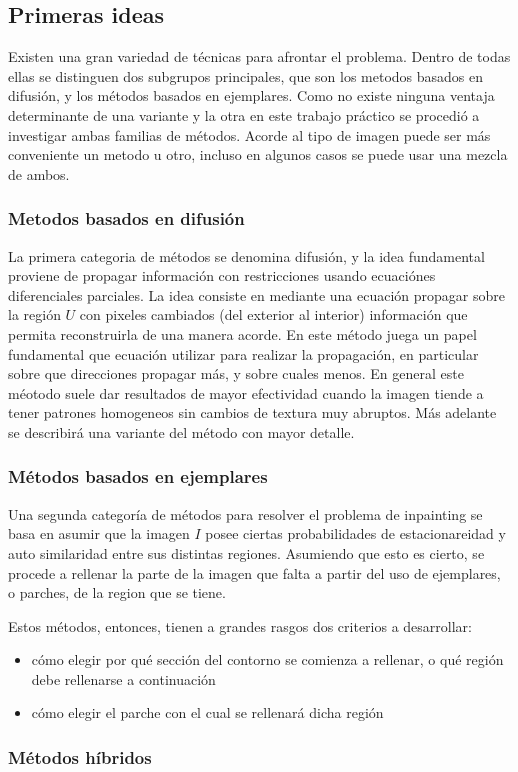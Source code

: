 \documentclass[assd_tpf_main.tex]{subfiles}
\begin{document}
\subsection{Primeras ideas}
Existen una gran variedad de técnicas para afrontar el problema. Dentro de todas ellas se distinguen dos subgrupos principales, que son los metodos basados en difusión, y los métodos basados en ejemplares. Como no existe ninguna ventaja determinante de una variante y la otra en este trabajo práctico se procedió a investigar ambas familias de métodos. Acorde al tipo de imagen puede ser más conveniente un metodo u otro, incluso en algunos casos se puede usar una mezcla de ambos.

\subsubsection{Metodos basados en difusión}
La primera categoria de métodos se denomina difusión, y la idea fundamental proviene de propagar información con restricciones usando ecuaciónes diferenciales parciales. La idea consiste en mediante una ecuación propagar sobre la región $U$ con pixeles cambiados (del exterior al interior) información que permita reconstruirla de una manera acorde.
En este método juega un papel fundamental que ecuación utilizar para realizar la propagación, en particular sobre que direcciones propagar más, y sobre cuales menos. En general este méotodo suele dar resultados de mayor efectividad cuando la imagen tiende a tener patrones homogeneos sin cambios de textura muy abruptos.  Más adelante se describirá una variante del método con mayor detalle.

\subsubsection{Métodos basados en ejemplares}

Una segunda categor\'ia de m\'etodos para resolver el problema de inpainting se basa en 
asumir que la imagen $I$ posee ciertas probabilidades de estacionareidad y auto similaridad 
entre sus distintas regiones. Asumiendo que esto es cierto, se procede a rellenar la parte
de la imagen que falta a partir del uso de ejemplares, o parches, de la region que se tiene.

Estos m\'etodos, entonces, tienen a grandes rasgos dos criterios a desarrollar:
\begin{itemize}
	\item c\'omo elegir por qu\'e secci\'on del contorno se comienza a rellenar, o qu\'e
	regi\'on debe rellenarse a continuaci\'on
	\item c\'omo elegir el parche con el cual se rellenar\'a dicha regi\'on
\end{itemize}




\subsubsection{M\'etodos h\'ibridos}
\end{document}
